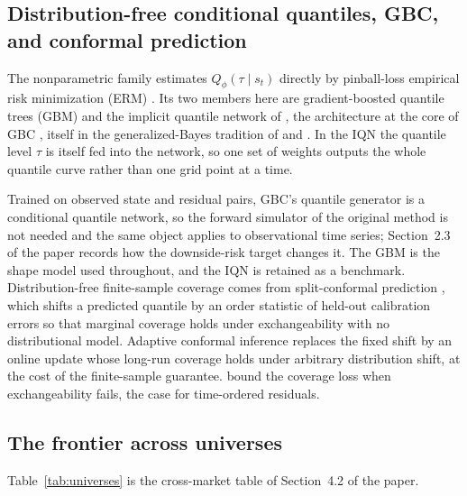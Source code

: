 \documentclass[11pt]{article}
\begin{document}
\subsection*{Distribution-free conditional quantiles, GBC, and conformal prediction}
The nonparametric family estimates $Q_\phi(\tau \mid s_t)$ directly by pinball-loss empirical risk minimization (ERM) \citep{koenker1978, steinwart2011}. Its two members here are gradient-boosted quantile trees (GBM) \citep{friedman2001} and the implicit quantile network of \citet{dabney2018iqn}, the architecture at the core of GBC \citep{polson2023gbc, nareklishvili2025gqbp}, itself in the generalized-Bayes tradition of \citet{jiang2008gibbs} and \citet{bissiri2016general}. In the IQN the quantile level $\tau$ is itself fed into the network, so one set of weights outputs the whole quantile curve rather than one grid point at a time.

Trained on observed state and residual pairs, GBC's quantile generator is a conditional quantile network, so the forward simulator of the original method is not needed and the same object applies to observational time series; Section~2.3 of the paper records how the downside-risk target changes it. The GBM is the shape model used throughout, and the IQN is retained as a benchmark. Distribution-free finite-sample coverage comes from split-conformal prediction \citep{vovk2005, lei2018, romano2019cqr}, which shifts a predicted quantile by an order statistic of held-out calibration errors so that marginal coverage holds under exchangeability with no distributional model. Adaptive conformal inference \citep{gibbs2021aci} replaces the fixed shift by an online update whose long-run coverage holds under arbitrary distribution shift, at the cost of the finite-sample guarantee. \citet{barber2023} bound the coverage loss when exchangeability fails, the case for time-ordered residuals.

\subsection*{The frontier across universes}
Table~\ref{tab:universes} is the cross-market table of Section~4.2 of the paper.
\end{document}
